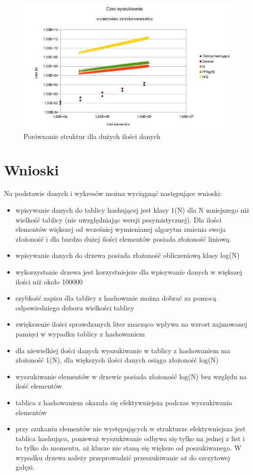 \documentclass[12pt,a4paper,titlepage]{article}
\begin{document}
\begin{figure}[h]
\begin{center}
\includegraphics[scale=0.5]{wyszukiwanie_duze.jpg}
\caption{Porównanie struktur dla dużych ilości danych}
\end{center}
\end{figure}


\newpage
\section{Wnioski}
Na podstawie danych i wykresów można wyciągnąć następujące wnioski:
\begin{itemize}
\item wpisywanie danych do tablicy hashującej jest klasy 1(N) dla N mniejszego niż wielkość tablicy (nie uwzględniając wersji pesymistycznej). Dla ilości elementów większej od wcześniej wymienianej algorytm zmienia swoja złożoność i dla bardzo dużej ilości elementów posiada złożoność liniową.
\item wpisywanie danych do drzewa posiada złożoność obliczeniową klasy log(N)
\item wykorzystanie drzewa jest korzystniejsze dla wpisywanie danych w większej ilości niż około 100000
\item szybkość zapisu dla tablicy z hashowanie można dobrać za pomocą odpowiedniego doboru wielkości tablicy
\item zwiększenie ilości sprawdzanych liter znacząco wpływa na wzrost zajmowanej pamięci w wypadku tablicy z hashowaniem
\item dla niewielkiej ilości danych wyszukiwanie w tablicy z hashowaniem ma złożoność 1(N), dla większych ilości danych osiąga złożoność log(N)
\item wyszukiwanie elementów w drzewie posiada złożoność log(N) bez względu na ilość elementów
\item tablica z hashowaniem okazała się efektywniejsza podczas wyszukiwania elementów
\item przy szukaniu elementów nie występujących w strukturze efektywniejsza jest tablica hashująca, ponieważ wyszukiwanie odbywa się tylko na jednej z list i to tylko do momentu, aż klucze nie staną się większe od poszukiwanego. W wypadku drzewa należy przeprowadzić przeszukiwanie aż do szczytowej gałęzi.
\end{itemize}
\end{document}

